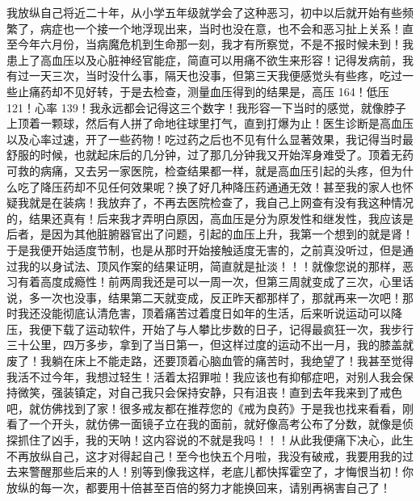 \begin{case}\label{126case2}
    我放纵自己将近二十年，从小学五年级就学会了这种恶习，初中以后就开始有些频繁了，病症也一个接一个地浮现出来，当时也没在意，也不会和恶习扯上关系！直至今年六月份，当病魔危机到生命那一刻，我才有所察觉，不是不报时候未到！我患上了高血压以及心脏神经官能症，简直可以用痛不欲生来形容！记得发病前，我有过一天三次，当时没什么事，隔天也没事，但第三天我便感觉头有些疼，吃过一些止痛药却不见好转，于是去检查，测量血压得到的结果是，高压 164！低压 121！心率 139！我永远都会记得这三个数字！我形容一下当时的感觉，就像脖子上顶着一颗球，然后有人拼了命地往球里打气，直到打爆为止！医生诊断是高血压以及心率过速，开了一些药物！吃过药之后也不见有什么显著效果，我记得当时最舒服的时候，也就起床后的几分钟，过了那几分钟我又开始浑身难受了。顶着无药可救的病痛，又去另一家医院，检查结果都一样，就是高血压引起的头疼，但为什么吃了降压药却不见任何效果呢？换了好几种降压药通通无效！甚至我的家人也怀疑我就是在装病！我放弃了，不再去医院检查了，我自己上网查有没有我这种情况的，结果还真有！后来我才弄明白原因，高血压是分为原发性和继发性，我应该是后者，是因为其他脏腑器官出了问题，引起的血压上升，我第一个想到的就是肾！于是我便开始适度节制，也是从那时开始接触适度无害的，之前真没听过，但是通过我的以身试法、顶风作案的结果证明，简直就是扯淡！！！就像您说的那样，恶习有着高度成瘾性！前两周我还是可以一周一次，但第三周就变成了三次，心里话说，多一次也没事，结果第二天就变成，反正昨天都那样了，那就再来一次吧！那时我还没能彻底认清危害，顶着痛苦过着度日如年的生活，后来听说运动可以降压，我便下载了运动软件，开始了与人攀比步数的日子，记得最疯狂一次，我步行三十公里，四万多步，拿到了当日第一，但这样过度的运动不出一月，我的膝盖就废了！我躺在床上不能走路，还要顶着心脑血管的痛苦时，我绝望了！我甚至觉得我活不过今年，我想过轻生！活着太招罪啦！我应该也有抑郁症吧，对别人我会保持微笑，强装镇定，对自己我只会保持安静，只有沮丧！直到去年我来到了戒色吧，就仿佛找到了家！很多戒友都在推荐您的《戒为良药》于是我也找来看看，刚看了一个开头，就仿佛一面镜子立在我的面前，就好像高考公布了分数，就像是侦探抓住了凶手，我的天呐！这内容说的不就是我吗！！！从此我便痛下决心，此生不再放纵自己，这才对得起自己！至今也快五个月啦，我没有破戒，我要用我的过去来警醒那些后来的人！别等到像我这样，老底儿都快挥霍空了，才悔恨当初！你放纵的每一次，都要用十倍甚至百倍的努力才能换回来，请别再祸害自己了！


\end{case}
